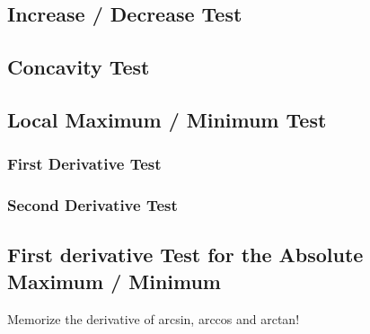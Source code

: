 \documentclass{note}
\begin{document}
\subsection{Increase / Decrease Test}

\subsection{Concavity Test}

\subsection{Local Maximum / Minimum Test}

\subsubsection{First Derivative Test}
\subsubsection{Second Derivative Test}

\subsection{First derivative Test for the Absolute Maximum / Minimum}

\begin{note}
    Memorize the derivative of arcsin, arccos and arctan!
\end{note}
\end{document}
